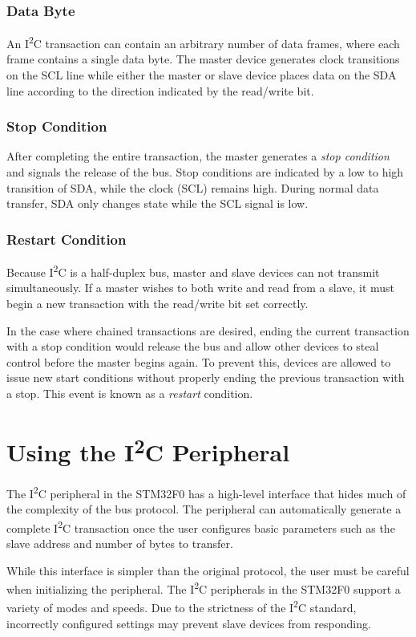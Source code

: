 \documentclass[openany,11pt,fleqn]{book} %
\begin{document}
        \subsubsection{Data Byte}
        An I\textsuperscript{2}C transaction can contain an arbitrary number of data frames, where each frame contains a single data byte. The master device generates clock transitions on the SCL line while either the master or slave device places data on the SDA line according to the direction indicated by the read/write bit. 
        \subsubsection{Stop Condition}
        After completing the entire transaction, the master generates a \textit{stop condition} and signals the release of the bus. Stop conditions are indicated by a low to high transition of SDA, while the clock (SCL) remains high. During normal data transfer, SDA only changes state while the SCL signal is low. 
        \subsubsection{Restart Condition}
        Because I\textsuperscript{2}C is a half-duplex bus, master and slave devices can not transmit simultaneously. If a master wishes to both write and read from a slave, it must begin a new transaction with the read/write bit set correctly. 
        
        In the case where chained transactions are desired, ending the current transaction with a stop condition would release the bus and allow other devices to steal control before the master begins again. To prevent this, devices are allowed to issue new start conditions without properly ending the previous transaction with a stop. This event is known as a \textit{restart} condition. 

\section{Using the I\textsuperscript{2}C Peripheral}
    The I\textsuperscript{2}C peripheral in the STM32F0 has a high-level interface that hides much of the complexity of the bus protocol. The peripheral can automatically generate a complete I\textsuperscript{2}C transaction once the user configures basic parameters such as the slave address and number of bytes to transfer. 
    
    While this interface is simpler than the original protocol, the user must be careful when initializing the peripheral. The I\textsuperscript{2}C peripherals in the STM32F0 support a variety of modes and speeds. Due to the strictness of the I\textsuperscript{2}C standard, incorrectly configured settings may prevent slave devices from responding.
\end{document}

